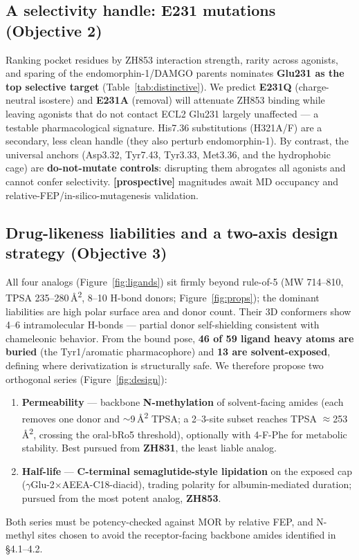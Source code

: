 \documentclass[11pt]{article}
\newcommand{\Angsq}{\AA\textsuperscript{2}}
\newcommand{\gm}{$\gamma$}
\newcommand{\x}{$\times$}
\newcommand{\approxx}{$\approx$}
\newcommand{\ca}{$\sim$}
\begin{document}
\subsection{A selectivity handle: E231 mutations (Objective 2)}

Ranking pocket residues by ZH853 interaction strength, rarity across agonists, and sparing of the
endomorphin-1/DAMGO parents nominates \textbf{Glu231 as the top selective target}
(Table~\ref{tab:distinctive}). We predict \textbf{E231Q} (charge-neutral isostere) and \textbf{E231A}
(removal) will attenuate ZH853 binding while leaving agonists that do not contact ECL2 Glu231 largely
unaffected --- a testable pharmacological signature. His7.36 substitutions (H321A/F) are a secondary,
less clean handle (they also perturb endomorphin-1). By contrast, the universal anchors (Asp3.32,
Tyr7.43, Tyr3.33, Met3.36, and the hydrophobic cage) are \textbf{do-not-mutate controls}: disrupting
them abrogates all agonists and cannot confer selectivity. \textbf{[prospective]} magnitudes await MD
occupancy and relative-FEP/in-silico-mutagenesis validation.

\subsection{Drug-likeness liabilities and a two-axis design strategy (Objective 3)}

All four analogs (Figure~\ref{fig:ligands}) sit firmly beyond rule-of-5 (MW 714--810,
TPSA 235--280\,\Angsq, 8--10 H-bond donors; Figure~\ref{fig:props}); the dominant liabilities are high
polar surface area and donor count. Their 3D
conformers show 4--6 intramolecular H-bonds --- partial donor self-shielding consistent with
chameleonic behavior. From the bound pose, \textbf{46 of 59 ligand heavy atoms are buried} (the
Tyr1/aromatic pharmacophore) and \textbf{13 are solvent-exposed}, defining where derivatization is
structurally safe. We therefore propose two orthogonal series (Figure~\ref{fig:design}):
\begin{enumerate}
  \item \textbf{Permeability} --- backbone \textbf{N-methylation} of solvent-facing amides (each
  removes one donor and \ca9\,\Angsq{} TPSA; a 2--3-site subset reaches TPSA \approxx253\,\Angsq,
  crossing the oral-bRo5 threshold), optionally with 4-F-Phe for metabolic stability. Best pursued from
  \textbf{ZH831}, the least liable analog.
  \item \textbf{Half-life} --- \textbf{C-terminal semaglutide-style lipidation} on the exposed cap
  (\gm Glu-2\x AEEA-C18-diacid), trading polarity for albumin-mediated duration; pursued from the most
  potent analog, \textbf{ZH853}.
\end{enumerate}
Both series must be potency-checked against MOR by relative FEP, and N-methyl sites chosen to avoid the
receptor-facing backbone amides identified in \S4.1--4.2.
\end{document}
